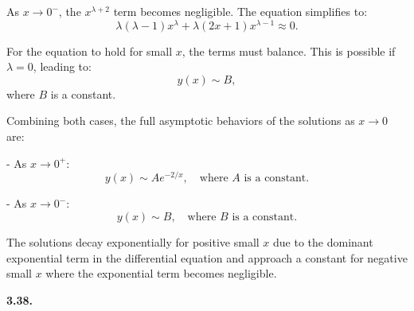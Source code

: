 \documentclass{article}
\begin{document}
{    As \( x \to 0^- \), the \( x^{\lambda + 2} \) term becomes negligible. The equation simplifies to:
    \[
    \lambda (\lambda - 1) x^{\lambda} + \lambda (2x + 1) x^{\lambda - 1} \approx 0.
    \]
    
    For the equation to hold for small \( x \), the terms must balance. This is possible if \( \lambda = 0 \), leading to:
    \[
    y(x) \sim B,
    \]
    where \( B \) is a constant.
    
    Combining both cases, the full asymptotic behaviors of the solutions as \( x \to 0 \) are:
    
    - As \( x \to 0^+ \):
      \[
      y(x) \sim A e^{-2/x}, \quad \text{where } A \text{ is a constant}.
      \]
    
    - As \( x \to 0^- \):
      \[
      y(x) \sim B, \quad \text{where } B \text{ is a constant}.
      \]
    
    The solutions decay exponentially for positive small \( x \) due to the dominant exponential term in the differential equation and approach a constant for negative small \( x \) where the exponential term becomes negligible.
    
}

\textbf{3.38.}
\end{document}
